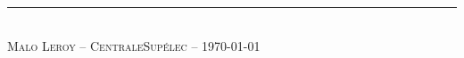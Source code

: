 \documentclass[a4paper, notitlepage]{report}
\begin{document}
\newcommand{\HRule}{\rule{\linewidth}{0.5mm}}



\thispagestyle{empty}


\thispagestyle{empty}
\setcounter{page}{0}


\renewcommand{\arraystretch}{1.5}


~
\thispagestyle{empty}
\setcounter{page}{0}
\newpage








\newpage

\renewcommand{\thepage}{}




\vfill{}

\HRule \\[0.4cm]
\hfill{} \textsc{Malo \textsc{Leroy}} -- \textsc{CentraleSupélec} -- \today
\end{document}
